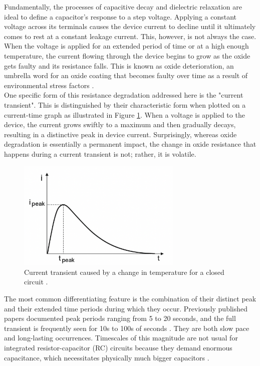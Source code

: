 Fundamentally, the processes of capacitive decay and dielectric relaxation are ideal to define a capacitor's response to a step voltage. Applying a constant voltage across its terminals causes the device current to decline until it ultimately comes to rest at a constant leakage current. This, however, is not always the case. When the voltage is applied for an extended period of time or at a high enough temperature, the current flowing through the device begins to grow as the oxide gets faulty and its resistance falls. This is known as oxide deterioration, an umbrella word for an oxide coating that becomes faulty over time as a result of environmental stress factors \cite{ghibaudo1999emerging}. \\

\noindent One specific form of this resistance degradation addressed here is the "current transient". This is distinguished by their characteristic form when plotted on a current-time graph as illustrated in Figure \ref{fig:4a}. When a voltage is applied to the device, the current grows swiftly to a maximum and then gradually decays, resulting in a distinctive peak in device current. Surprisingly, whereas oxide degradation is essentially a permanent impact, the change in oxide resistance that happens during a current transient is not; rather, it is volatile. \\

\begin{figure}[htbp!] 
    \centering    
    \includegraphics[width=0.7\textwidth]{Chapter4/Figs/a.png}
    \caption[Current transients illustration]{Current transient caused by a change in temperature for a closed circuit \cite{zafar2011measurement}.}
    \label{fig:4a}
\end{figure}

\noindent The most common differentiating feature is the combination of their distinct peak and their extended time periods during which they occur. Previously published papers documented peak periods ranging from 5 to 20 seconds, and the full transient is frequently seen for 10s to 100s of seconds \cite{saha2001transient}. They are both slow pace and long-lasting occurrences. Timescales of this magnitude are not usual for integrated resistor-capacitor (RC) circuits because they demand enormous capacitance, which necessitates physically much bigger capacitors \cite{el2006space}. \\

